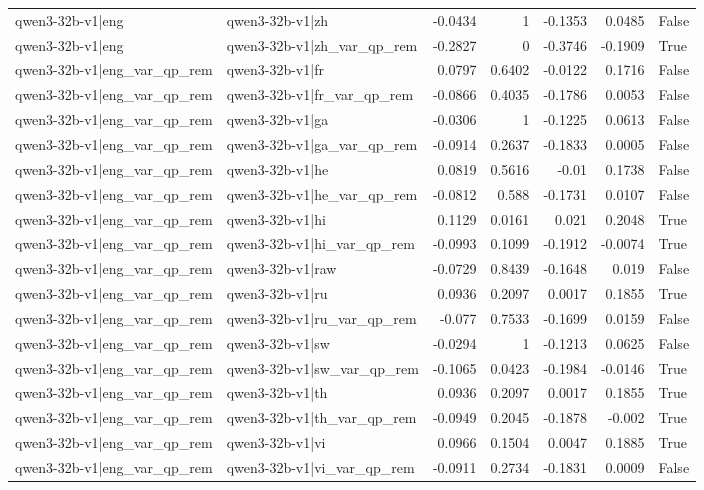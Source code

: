 \begin{table}
\begin{tabular}{l l r r r r l}
qwen3-32b-v1|eng & qwen3-32b-v1|zh & -0.0434 & 1 & -0.1353 & 0.0485 & False \\
qwen3-32b-v1|eng & qwen3-32b-v1|zh_var_qp_rem & -0.2827 & 0 & -0.3746 & -0.1909 & True \\
qwen3-32b-v1|eng_var_qp_rem & qwen3-32b-v1|fr & 0.0797 & 0.6402 & -0.0122 & 0.1716 & False \\
qwen3-32b-v1|eng_var_qp_rem & qwen3-32b-v1|fr_var_qp_rem & -0.0866 & 0.4035 & -0.1786 & 0.0053 & False \\
qwen3-32b-v1|eng_var_qp_rem & qwen3-32b-v1|ga & -0.0306 & 1 & -0.1225 & 0.0613 & False \\
qwen3-32b-v1|eng_var_qp_rem & qwen3-32b-v1|ga_var_qp_rem & -0.0914 & 0.2637 & -0.1833 & 0.0005 & False \\
qwen3-32b-v1|eng_var_qp_rem & qwen3-32b-v1|he & 0.0819 & 0.5616 & -0.01 & 0.1738 & False \\
qwen3-32b-v1|eng_var_qp_rem & qwen3-32b-v1|he_var_qp_rem & -0.0812 & 0.588 & -0.1731 & 0.0107 & False \\
qwen3-32b-v1|eng_var_qp_rem & qwen3-32b-v1|hi & 0.1129 & 0.0161 & 0.021 & 0.2048 & True \\
qwen3-32b-v1|eng_var_qp_rem & qwen3-32b-v1|hi_var_qp_rem & -0.0993 & 0.1099 & -0.1912 & -0.0074 & True \\
qwen3-32b-v1|eng_var_qp_rem & qwen3-32b-v1|raw & -0.0729 & 0.8439 & -0.1648 & 0.019 & False \\
qwen3-32b-v1|eng_var_qp_rem & qwen3-32b-v1|ru & 0.0936 & 0.2097 & 0.0017 & 0.1855 & True \\
qwen3-32b-v1|eng_var_qp_rem & qwen3-32b-v1|ru_var_qp_rem & -0.077 & 0.7533 & -0.1699 & 0.0159 & False \\
qwen3-32b-v1|eng_var_qp_rem & qwen3-32b-v1|sw & -0.0294 & 1 & -0.1213 & 0.0625 & False \\
qwen3-32b-v1|eng_var_qp_rem & qwen3-32b-v1|sw_var_qp_rem & -0.1065 & 0.0423 & -0.1984 & -0.0146 & True \\
qwen3-32b-v1|eng_var_qp_rem & qwen3-32b-v1|th & 0.0936 & 0.2097 & 0.0017 & 0.1855 & True \\
qwen3-32b-v1|eng_var_qp_rem & qwen3-32b-v1|th_var_qp_rem & -0.0949 & 0.2045 & -0.1878 & -0.002 & True \\
qwen3-32b-v1|eng_var_qp_rem & qwen3-32b-v1|vi & 0.0966 & 0.1504 & 0.0047 & 0.1885 & True \\
qwen3-32b-v1|eng_var_qp_rem & qwen3-32b-v1|vi_var_qp_rem & -0.0911 & 0.2734 & -0.1831 & 0.0009 & False \\

\end{tabular}
\end{table}
